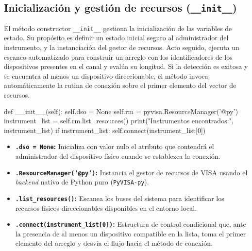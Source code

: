\subsection{Inicialización y gestión de recursos (\texttt{\_\_init\_\_})}
El método constructor \texttt{\_\_init\_\_} gestiona la inicialización de las variables de estado. Su propósito es definir un estado inicial seguro al administrador del instrumento, y la instanciación del gestor de recursos. Acto seguido, ejecuta un escaneo automatizado para construir un arreglo con los identificadores de los dispositivos presentes en el canal y evalúa su longitud. Si la detección es exitosa y se encuentra al menos un dispositivo direccionable, el método invoca automáticamente la rutina de conexión sobre el primer elemento del vector de recursos.

\begin{python}
def __init__(self):
    self.dso = None
    self.rm = pyvisa.ResourceManager('@py')
    instrument_list = self.rm.list_resources()
    print("Instrumentos encontrados:", instrument_list)
    if instrument_list:
        self.connect(instrument_list[0])
\end{python}

\begin{itemize}
    \item \textbf{\texttt{.dso = None}:} Inicializa con valor nulo el atributo que contendrá el administrador del dispositivo físico cuando se establezca la conexión.
    \item \textbf{\texttt{.ResourceManager('@py')}:} Instancia el gestor de recursos de VISA usando el \textit{backend} nativo de Python puro (\texttt{PyVISA-py}).
    \item \textbf{\texttt{.list\_resources()}:} Escanea los buses del sistema para identificar los recursos físicos direccionables disponibles en el entorno local.
    \item \textbf{\texttt{.connect(instrument\_list[0])}:} Estructura de control condicional que, ante la presencia de al menos un dispositivo compatible en la lista, toma el primer elemento del arreglo y desvía el flujo hacia el método de conexión.
\end{itemize}

